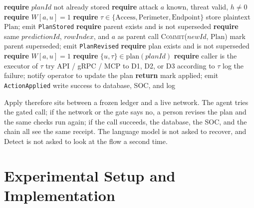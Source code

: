 \documentclass[10pt, conference]{IEEEtran}
\begin{document}
\begin{algorithm}[t]
\caption{Commit and Apply}
\label{alg:commit-apply}
\begin{algorithmic}[1]
    \STATE \textbf{require} $\mathit{planId}$ not already stored
    \STATE \textbf{require} attack $a$ known, threat valid, $h\neq 0$
        \STATE \textbf{require} $W[a,u]=1$ 
        \STATE \textbf{require} $\tau\in\{\text{Access},\text{Perimeter},\text{Endpoint}\}$
    \ENDFOR
    \STATE store plaintext $\mathrm{Plan}$; emit \texttt{PlanStored}
\ENDPROCEDURE
{}
    \STATE \textbf{require} parent exists and is not superseded
    \STATE \textbf{require} same $\mathit{predictionId}$, $\mathit{rowIndex}$, and $a$ as parent
    \STATE call \textsc{Commit}($\mathit{newId}$, $\mathrm{Plan}$) 
    \STATE mark parent superseded; emit \texttt{PlanRevised}
\ENDPROCEDURE
{}
    \STATE \textbf{require} plan exists and is not superseded
    \STATE \textbf{require} $W[a,u]=1$ 
    \STATE \textbf{require} $\{u,\tau\}\in\mathrm{plan}(\mathit{planId})$ 
    \STATE \textbf{require} caller is the executor of $\tau$
    \STATE try API / gRPC / MCP to D1, D2, or D3 according to $\tau$
        \STATE log the failure; notify operator to update the plan
        \STATE \textbf{return} 
    \ENDIF
    \STATE mark applied; emit \texttt{ActionApplied}
    \STATE write success to database, SOC, and log
\ENDPROCEDURE
\end{algorithmic}
\end{algorithm}

Apply therefore sits between a frozen ledger and a live network. The agent tries the gated call; if the network or the gate says no, a person revises the plan and the same checks run again; if the call succeeds, the database, the SOC, and the chain all see the same receipt. The language model is not asked to recover, and Detect is not asked to look at the flow a second time.




\section{Experimental Setup and Implementation}
\label{sec:setup}
\end{document}
